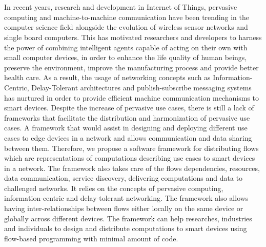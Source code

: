 \chapter{\abstractname}
In recent years, research and development in Internet of Things, pervasive computing and machine-to-machine communication have been trending in the computer science field alongside the evolution of wireless sensor networks and single board computers. 
This has  motivated researchers and developers to harness the power of combining intelligent agents capable of acting on their own with small computer devices, in order to enhance the  life quality of human beings, preserve the environment, improve the manufacturing  process and provide better health care. As a result, the usage of networking concepts such as Information-Centric, Delay-Tolerant architectures and publish-subscribe messaging systems has nurtured in order to provide efficient machine communication mechanisms to smart devices. Despite the increase of pervasive use cases, there is still a lack of frameworks that facilitate the distribution and harmonization of pervasive use cases. A framework that would assist in designing and deploying different use cases to edge devices in a network and allows communication and data sharing between them.  Therefore, we propose a software framework for distributing flows which are representations of computations describing use cases to smart devices in a network. The framework also takes care of the flows dependencies, resources, data communication, service discovery, delivering computations and data to challenged networks. It relies on the concepts of pervasive computing, information-centric and delay-tolerant networking. The framework also allows having inter-relationships between flows either locally on the same device or globally across different devices. The framework can help researches, industries and individuals to design and distribute computations to smart devices using flow-based programming with minimal amount of code.